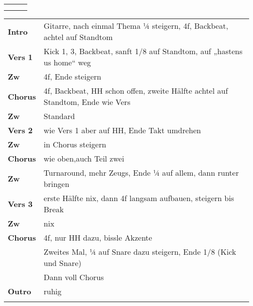 

\begin{tabular}{p{0.6cm}p{12cm}p{1.4cm}}
	\rowcolor{cyan} \myRow{\thesongnumber} & \myRow{Christ Our Glory} & \myRow{152} \\
	                                       &                          &             \\
\end{tabular}

\begin{tabular}{p{1.6cm}l}
	\textbf{Intro}  & Gitarre, nach einmal Thema ¼ steigern, 4f, Backbeat, achtel auf Standtom       \\
	\textbf{Vers 1} & Kick 1, 3, Backbeat, sanft 1/8 auf Standtom, auf „hastens us home“ weg         \\
	\textbf{Zw}     & 4f, Ende steigern                                                              \\
	\textbf{Chorus} & 4f, Backbeat, HH schon offen, zweite Hälfte achtel auf Standtom, Ende wie Vers \\
	\textbf{Zw}     & Standard                                                                       \\
	\textbf{Vers 2} & wie Vers 1 aber auf HH, Ende Takt umdrehen                                     \\
	\textbf{Zw}     & in Chorus steigern                                                             \\
	\textbf{Chorus} & wie oben,auch Teil zwei                                                        \\
	\textbf{Zw}     & Turnaround, mehr Zeugs, Ende ¼ auf allem, dann runter bringen                  \\
	\textbf{Vers 3} & erste Hälfte nix, dann 4f langsam aufbauen, steigern bis Break                 \\
	\textbf{Zw}     & nix                                                                            \\
	\textbf{Chorus} & 4f, nur HH dazu, bissle Akzente                                                \\
	                & Zweites Mal, ¼ auf Snare dazu steigern, Ende 1/8 (Kick und Snare)              \\
	                & Dann voll Chorus                                                               \\
	\textbf{Outro}  & ruhig                                                                          \\
	                &                                                                                \\
\end{tabular}
